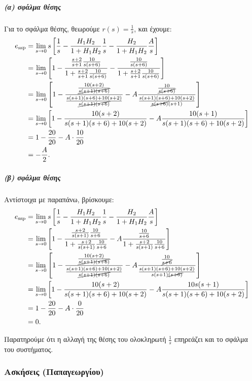 \documentclass[11pt,a4paper,notitlepage,fleqn,draft]{article}
\begin{document}
\subparagraph{(α) σφάλμα θέσης}
Για το σφάλμα θέσης, θεωρούμε \( r(s) = \frac{1}{s} \),  και έχουμε:
\begin{align*}
	e_{\mathrm{ssp}} &= \lim_{s\to 0}s\left[
	\frac{1}{s} - \frac{H_1H_2}{1+H_1H_2} \frac{1}{s}
	- \frac{H_2}{1+H_1H_2}\frac{A}{s}
	\right]
	\\ &=
	\lim_{s\to 0} \left[
	1 - \frac{\frac{s+2}{s+1}\frac{10}{s(s+6)}}{1+\frac{s+2}{s+1}\frac{10}{s(s+6)}}
	- \frac{\frac{10}{s(s+6)}}{1+\frac{s+2}{s+1}\frac{10}{s(s+6)}}
	\right]
	\\ &= \lim_{s\to 0} \left[
	1-\frac{\frac{10(s+2)}{\cancel{s(s+1)(s+6)}}}{\frac{s(s+1)(s+6)+10(s+2)}{\cancel{s(s+1)(s+6)}}} - A
	\frac{\frac{10}{\cancel{s(s+6)}}}{\frac{s(s+1)(s+6)+10(s+2)}{\cancel{s(s+6)}(s+1)}}
	\right]
	\\ &= \lim_{s\to 0} \left[
	1- \frac{10(s+2)}{s(s+1)(s+6)+10(s+2)}
	-A\frac{10(s+1)}{s(s+1)(s+6)+10(s+2)}
	\right]
	\\ &= 1 - \frac{20}{20} - A\cdot\frac{10}{20}
	\\ &= -\frac{A}{2}.
\end{align*}
\subparagraph{(β) σφάλμα θέσης}
Αντίστοιχα με παραπάνω, βρίσκουμε:
\begin{align*}
    e_{\mathrm{ssp}} &= \lim_{s\to 0}s\left[
    \frac{1}{s} - \frac{H_1H_2}{1+H_1H_2} \frac{1}{s}
    - \frac{H_2}{1+H_1H_2}\frac{A}{s}
    \right]
    \\ &=
    \lim_{s\to 0} \left[
    1 - \frac{\frac{s+2}{s(s+1)}\frac{10}{s+6}}{1+\frac{s+2}{s(s+1)}\frac{10}{s+6}}
    - A\frac{\frac{10}{s+6}}{1+\frac{s+2}{s(s+1)}\frac{10}{s+6}}
    \right]
    \\ &=
    \lim_{s\to 0} \left[
    1-
    \frac{\frac{10(s+2)}{\cancel{s(s+1)(s+6)}}}{\frac{s(s+1)(s+6)+10(s+2)}{\cancel{s(s+1)(s+6)}}}
    - A\frac{\frac{10}{\cancel{s+6}}}{
    	\frac{s(s+1)(s+6)+10(s+2)}{s(s+1)\cancel{(s+6)}}
    	}
    \right]
    \\ &=
    \lim_{s\to 0} \left[
    1 - \frac{10(s+2)}{s(s+1)(s+6)+10(s+2)}
    - A \frac{10s(s+1)}{s(s+1)(s+6)+10(s+2)}
    \right]
    \\ &= 1 - \frac{20}{20} - A\cdot \frac{0}{20}
    \\ &= 0.
\end{align*}

Παρατηρούμε ότι η αλλαγή της θέσης του ολοκληρωτή \( \displaystyle \frac{1}{s} \) επηρεάζει
και το σφάλμα του συστήματος.

\subsubsection{Ασκήσεις (Παπαγεωργίου)}
\end{document}
